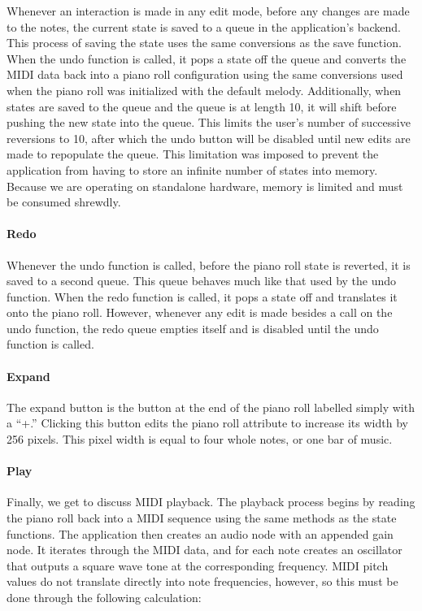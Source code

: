 Whenever an interaction is made in any edit mode, before any changes are made to the notes, the
current state is saved to a queue in the application’s backend. This process of saving the state
uses the same conversions as the save function. When the undo function is called, it pops a state
off the queue and converts the MIDI data back into a piano roll configuration using the same
conversions used when the piano roll was initialized with the default melody. Additionally, when
states are saved to the queue and the queue is at length 10, it will shift before pushing the new
state into the queue. This limits the user’s number of successive reversions to 10, after which
the undo button will be disabled until new edits are made to repopulate the queue. This
limitation was imposed to prevent the application from having to store an infinite number of
states into memory. Because we are operating on standalone hardware, memory is limited and must be
consumed shrewdly.

\paragraph{Redo}

Whenever the undo function is called, before the piano roll state is reverted, it is saved to a
second queue. This queue behaves much like that used by the undo function. When the redo function
is called, it pops a state off and translates it onto the piano roll. However, whenever any edit is
made besides a call on the undo function, the redo queue empties itself and is disabled until the
undo function is called.

\paragraph{Expand}

The expand button is the button at the end of the piano roll labelled simply with a “+.” Clicking
this button edits the piano roll attribute to increase its width by 256 pixels. This pixel width
is equal to four whole notes, or one bar of music.

\paragraph{Play}

Finally, we get to discuss MIDI playback. The playback process begins by reading the piano roll
back into a MIDI sequence using the same methods as the state functions. The application then
creates an audio node with an appended gain node. It iterates through the MIDI data, and for each
note creates an oscillator that outputs a square wave tone at the corresponding frequency. MIDI
pitch values do not translate directly into note frequencies, however, so this must be done through
the following calculation:

